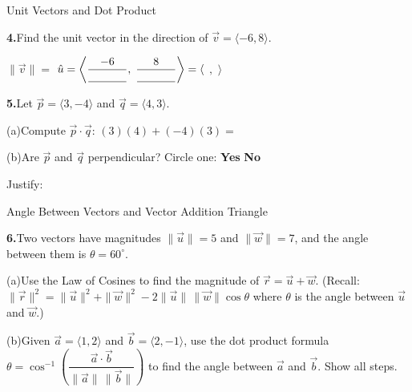 \documentclass[10pt]{article}
\begin{document}
\begin{notesbox}{Unit Vectors and Dot Product}

\textbf{4.}\quad Find the unit vector in the direction of $\vec{v} = \langle -6, 8\rangle$.

\vspace{4pt}
$\|\vec{v}\| = $ \blank{3cm} \qquad
$\hat{u} = \left\langle \dfrac{-6}{\blank{1.2cm}},\; \dfrac{8}{\blank{1.2cm}}\right\rangle
= \langle$ \blank{2.5cm}$,$ \blank{2.5cm}$\rangle$

\vspace{14pt}
\textbf{5.}\quad Let $\vec{p} = \langle 3, -4\rangle$ and $\vec{q} = \langle 4, 3\rangle$.

\vspace{4pt}
(a)\quad Compute $\vec{p} \cdot \vec{q}$: \quad
$(3)(4) + (-4)(3) = $ \blank{4cm}

\vspace{8pt}
(b)\quad Are $\vec{p}$ and $\vec{q}$ perpendicular?
Circle one: \quad \textbf{Yes} \quad \textbf{No}

\vspace{4pt}
Justify: \writeline

\end{notesbox}

\vspace{0.08in}

\begin{notesbox}{Angle Between Vectors and Vector Addition Triangle}

\textbf{6.}\quad Two vectors have magnitudes $\|\vec{u}\| = 5$ and $\|\vec{w}\| = 7$,
and the angle between them is $\theta = 60^\circ$.

\vspace{4pt}
(a)\quad Use the Law of Cosines to find the magnitude of $\vec{r} = \vec{u} + \vec{w}$.
(Recall: $\|\vec{r}\|^2 = \|\vec{u}\|^2 + \|\vec{w}\|^2 - 2\|\vec{u}\|\,\|\vec{w}\|\cos\theta$
where $\theta$ is the angle between $\vec{u}$ and $\vec{w}$.)


\vspace{4pt}
(b)\quad Given $\vec{a} = \langle 1, 2\rangle$ and $\vec{b} = \langle 2, -1\rangle$,
use the dot product formula $\theta = \cos^{-1}\!\left(\dfrac{\vec{a}\cdot\vec{b}}{\|\vec{a}\|\,\|\vec{b}\|}\right)$
to find the angle between $\vec{a}$ and $\vec{b}$. Show all steps.


\end{notesbox}
\end{document}
